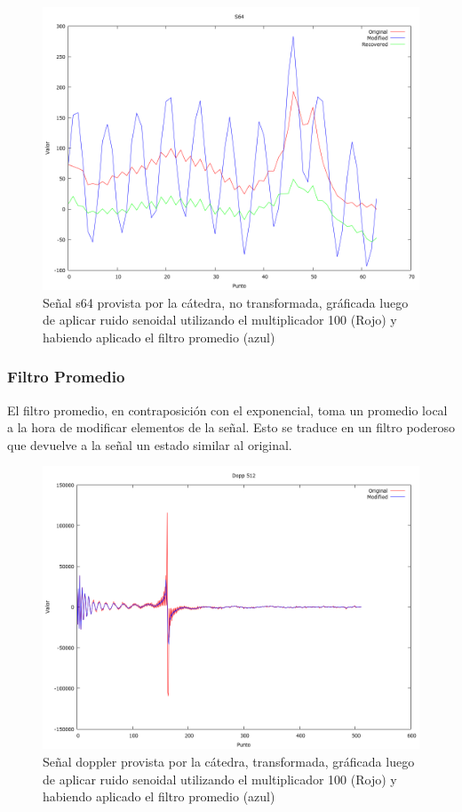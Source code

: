 \begin{figure}
\begin {center}
\includegraphics[width=360pt]{../matlab/s64-sin100-exp.png}
\end {center}
\caption{Se\~nal s64 provista por la c\'atedra, no transformada, gr\'aficada
luego de aplicar ruido senoidal utilizando el multiplicador 100 (Rojo) y 
habiendo aplicado el filtro promedio (azul)}
\label{fig:SinProm}
\end{figure}


\subsubsection{Filtro Promedio}

El filtro promedio, en contraposici\'on con el exponencial, toma un promedio
local a la hora de modificar elementos de la se\~nal. Esto se traduce en un
filtro poderoso que devuelve a la se\~nal un estado similar al original.

\begin{figure}
\begin {center}
\includegraphics[width=360pt]{../matlab/dopp512-sin100-avg-spec.png}
\end {center}
\caption{Se\~nal doppler provista por la c\'atedra, transformada, gr\'aficada
luego de aplicar ruido senoidal utilizando el multiplicador 100 (Rojo) y 
habiendo aplicado el filtro promedio (azul)}
\label{fig:SinProm}
\end{figure}

